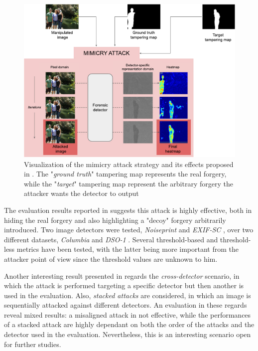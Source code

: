 \documentclass[conference]{IEEEtran} %
\begin{document}
        \begin{figure}[h]
            \centering
            \includegraphics[width=0.8\linewidth]{Img/mim_visual.png}
            \caption{Visualization of the mimicry attack strategy and its effects proposed in \cite{boato2024adversarial}. The "\textit{ground truth}" tampering map represents the real forgery, while the "\textit{target}" tampering map represent the arbitrary forgery the attacker wants the detector to output}
            \label{fig:mim_visual}
        \end{figure}

        The evaluation results reported in \cite{boato2024adversarial} suggests this attack is highly effective, both in hiding the real forgery and also highlighting a "decoy" forgery arbitrarily introduced. Two image detectors were tested, \textit{Noiseprint} \cite{cozzolino2019noiseprint} and \textit{EXIF-SC} \cite{huh2018fighting}, over two different datasets, \textit{Columbia} \cite{ng2004data} and \textit{DSO-1} \cite{carvalho2015illuminant}. Several threshold-based and threshold-less metrics have been tested, with the latter being more important from the attacker point of view since the threshold values are unknown to him.

        Another interesting result presented in \cite{boato2024adversarial} regards the \textit{cross-detector} scenario, in which the attack is performed targeting a specific detector but then another is used in the evaluation. Also, \textit{stacked attacks} are considered, in which an image is sequentially attacked against different detectors. An evaluation in these regards reveal mixed results: a misaligned attack in not effective, while the performances of a stacked attack are highly dependant on both the order of the attacks and the detector used in the evaluation. Nevertheless, this is an interesting scenario open for further studies.
\end{document}
